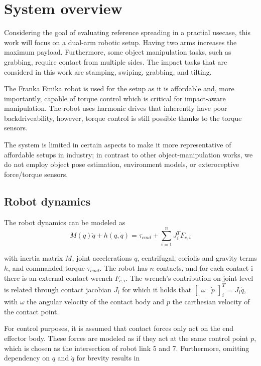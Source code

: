 \documentclass[a4paper, 10pt, conference]{ieeeconf}
\begin{document}
    \section{System overview}
    Considering the goal of evaluating reference spreading in a practial usecase, this work will focus on a dual-arm robotic setup. Having two arms increases the maximum payload. Furthermore, some object manipulation tasks, such as grabbing, require contact from multiple sides. The impact tasks that are considerd in this work are stamping, swiping, grabbing, and tilting. 

    The Franka Emika robot \cite{haddadinFrankaEmikaRobot2022} is used for the setup as it is affordable and, more importantly, capable of torque control which is critical for impact-aware manipulation. The robot uses harmonic drives that inherently have poor backdriveability, however, torque control is still possible thanks to the torque sensors. 

    The system is limited in certain aspects to make it more representative of affordable setups in industry; in contrast to other object-manipulation works, we do not employ object pose estimation, environment models, or exteroceptive force/torque sensors. 

    \subsection{Robot dynamics}
    The robot dynamics can be modeled as 
    \begin{equation}
    M(q)\ddot{q}+h(q,\dot{q})= \tau_{cmd} + \sum_{i=1}^n J_i^TF_{c,i}
    \end{equation}
    
    with inertia matrix $M$, joint accelerations $\ddot{q}$, centrifugal, coriolis and gravity terms $h$, and commanded torque $\tau_{cmd}$. The robot has $n$ contacts, and for each contact i there is an external contact wrench $F_{c,i}$. The wrench's contribution on joint level is related through contact jacobian $J_i$ for which it holds that $\begin{bmatrix} \omega & \dot{p} \end{bmatrix}_i^T=J_i\dot{q}$, with $\omega$ the angular velocity of the contact body and $\dot{p}$ the carthesian velocity of the contact point. 

    For control purposes, it is assumed that contact forces only act on the end effector body. These forces are modeled as if they act at the same control point $p$, which is chosen as the intersection of robot link 5 and 7. Furthermore, omitting dependency on $q$ and $\dot{q}$ for brevity results in
\end{document}
